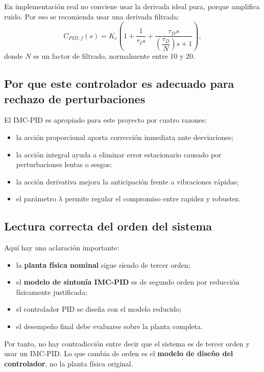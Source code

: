 \documentclass[11pt]{article}
\begin{document}
En implementaci\'on real no conviene usar la derivada ideal pura, porque amplifica ruido. Por eso se recomienda usar una derivada filtrada:
\begin{equation}
C_{PID,f}(s)=
K_c\left(
1+\frac{1}{\tau_I s}+\frac{\tau_D s}{\left(\dfrac{\tau_D}{N}\right)s+1}
\right),
\label{eq:pid_filtered}
\end{equation}
donde $N$ es un factor de filtrado, normalmente entre 10 y 20.

\subsection{Por que este controlador es adecuado para rechazo de perturbaciones}

El IMC-PID es apropiado para este proyecto por cuatro razones:

\begin{itemize}[leftmargin=1.2cm]
\item la acci\'on proporcional aporta correcci\'on inmediata ante desviaciones;
\item la acci\'on integral ayuda a eliminar error estacionario causado por perturbaciones lentas o sesgos;
\item la acci\'on derivativa mejora la anticipaci\'on frente a vibraciones r\'apidas;
\item el par\'ametro $\lambda$ permite regular el compromiso entre rapidez y robustez.
\end{itemize}

\subsection{Lectura correcta del orden del sistema}

Aqu\'i hay una aclaraci\'on importante:

\begin{itemize}[leftmargin=1.2cm]
\item la \textbf{planta f\'isica nominal} sigue siendo de tercer orden;
\item el \textbf{modelo de sinton\'ia IMC-PID} es de segundo orden por reducci\'on f\'isicamente justificada;
\item el controlador PID se dise\~na con el modelo reducido;
\item el desempe\~no final debe evaluarse sobre la planta completa.
\end{itemize}

Por tanto, no hay contradicci\'on entre decir que el sistema es de tercer orden y usar un IMC-PID. Lo que cambia de orden es el \textbf{modelo de dise\~no del controlador}, no la planta f\'isica original.
\end{document}
